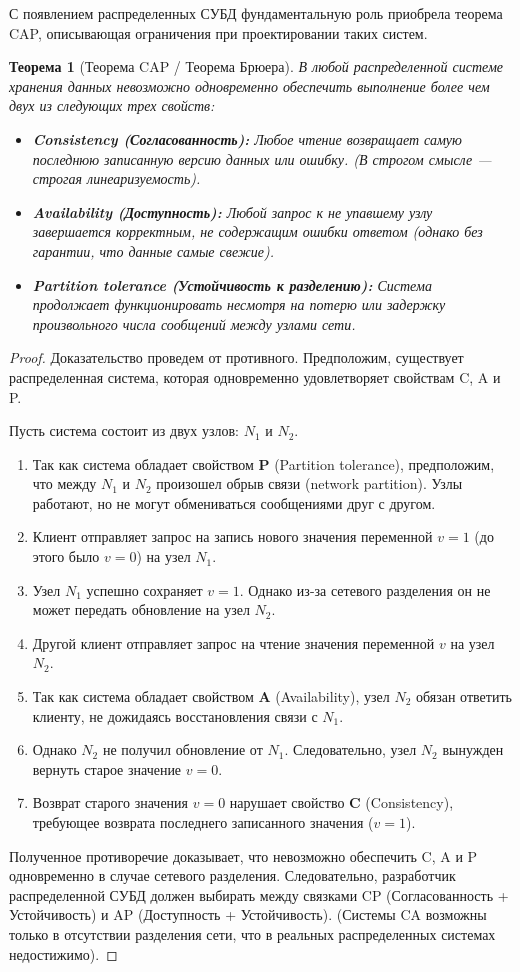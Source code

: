 \documentclass[12pt, a4paper]{article}
\newtheorem{theorem}{Теорема}
\begin{document}
С появлением распределенных СУБД фундаментальную роль приобрела теорема CAP, описывающая ограничения при проектировании таких систем.

\begin{theorem}[Теорема CAP / Теорема Брюера]
В любой распределенной системе хранения данных невозможно одновременно обеспечить выполнение более чем двух из следующих трех свойств:
\begin{itemize}
    \item \textbf{Consistency (Согласованность):} Любое чтение возвращает самую последнюю записанную версию данных или ошибку. (В строгом смысле — строгая линеаризуемость).
    \item \textbf{Availability (Доступность):} Любой запрос к не упавшему узлу завершается корректным, не содержащим ошибки ответом (однако без гарантии, что данные самые свежие).
    \item \textbf{Partition tolerance (Устойчивость к разделению):} Система продолжает функционировать несмотря на потерю или задержку произвольного числа сообщений между узлами сети.
\end{itemize}
\end{theorem}

\begin{proof}
Доказательство проведем от противного. Предположим, существует распределенная система, которая одновременно удовлетворяет свойствам C, A и P.

Пусть система состоит из двух узлов: $N_1$ и $N_2$.
\begin{enumerate}
    \item Так как система обладает свойством \textbf{P} (Partition tolerance), предположим, что между $N_1$ и $N_2$ произошел обрыв связи (network partition). Узлы работают, но не могут обмениваться сообщениями друг с другом.
    \item Клиент отправляет запрос на запись нового значения переменной $v = 1$ (до этого было $v = 0$) на узел $N_1$.
    \item Узел $N_1$ успешно сохраняет $v = 1$. Однако из-за сетевого разделения он не может передать обновление на узел $N_2$.
    \item Другой клиент отправляет запрос на чтение значения переменной $v$ на узел $N_2$.
    \item Так как система обладает свойством \textbf{A} (Availability), узел $N_2$ обязан ответить клиенту, не дожидаясь восстановления связи с $N_1$.
    \item Однако $N_2$ не получил обновление от $N_1$. Следовательно, узел $N_2$ вынужден вернуть старое значение $v = 0$.
    \item Возврат старого значения $v = 0$ нарушает свойство \textbf{C} (Consistency), требующее возврата последнего записанного значения ($v = 1$).
\end{enumerate}
Полученное противоречие доказывает, что невозможно обеспечить C, A и P одновременно в случае сетевого разделения. Следовательно, разработчик распределенной СУБД должен выбирать между связками CP (Согласованность + Устойчивость) и AP (Доступность + Устойчивость). (Системы CA возможны только в отсутствии разделения сети, что в реальных распределенных системах недостижимо).
\end{proof}
\end{document}
